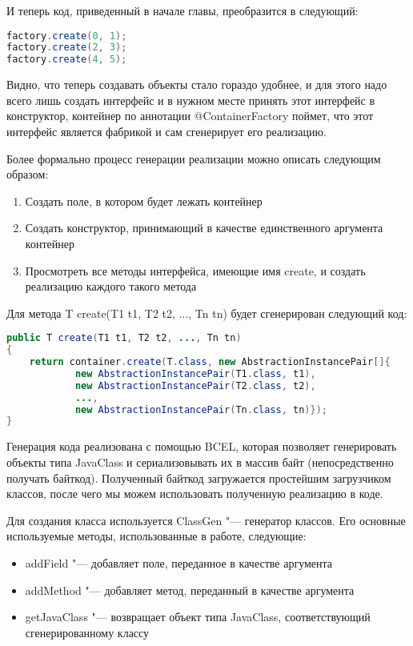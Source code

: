И теперь код, приведенный в начале главы, преобразится в следующий:

\begin{lstlisting}[language=Java,caption={Код с использованием контейнерных фабрик}]
factory.create(0, 1);
factory.create(2, 3);
factory.create(4, 5);
\end{lstlisting}

Видно, что теперь создавать объекты стало гораздо удобнее, и для этого надо всего лишь создать интерфейс и в нужном месте принять этот интерфейс в конструктор,
контейнер по аннотации @ContainerFactory поймет, что этот интерфейс является фабрикой и сам сгенерирует его реализацию.

Более формально процесс генерации реализации можно описать следующим образом:

\begin{enumerate}
	\item Создать поле, в котором будет лежать контейнер
	\item Создать конструктор, принимающий в качестве единственного аргумента контейнер
	\item Просмотреть все методы интерфейса, имеющие имя create, и создать реализацию каждого такого метода
\end{enumerate}

Для метода T create(T1 t1, T2 t2, ..., Tn tn) будет сгенерирован следующий код:

\begin{lstlisting}[language=Java,caption={Общий вид кода генерируемого метода}]
public T create(T1 t1, T2 t2, ..., Tn tn)
{
	return container.create(T.class, new AbstractionInstancePair[]{
			new AbstractionInstancePair(T1.class, t1),
			new AbstractionInstancePair(T2.class, t2),
			...,
			new AbstractionInstancePair(Tn.class, tn)});
}
\end{lstlisting}

Генерация кода реализована с помощью BCEL, которая позволяет генерировать объекты типа JavaClass и сериализовывать их в массив байт (непосредственно получать байткод). 
Полученный байткод загружается простейшим загрузчиком классов, после чего мы можем использовать полученную реализацию в коде.

Для создания класса используется ClassGen "--- генератор классов. Его основные используемые методы, использованные в работе, следующие:

\begin{itemize}
	\item addField "--- добавляет поле, переданное в качестве аргумента
	\item addMethod "--- добавляет метод, переданный в качестве аргумента
	\item getJavaClass "--- возвращает объект типа JavaClass, соответствующий сгенерированному классу
\end{itemize}

